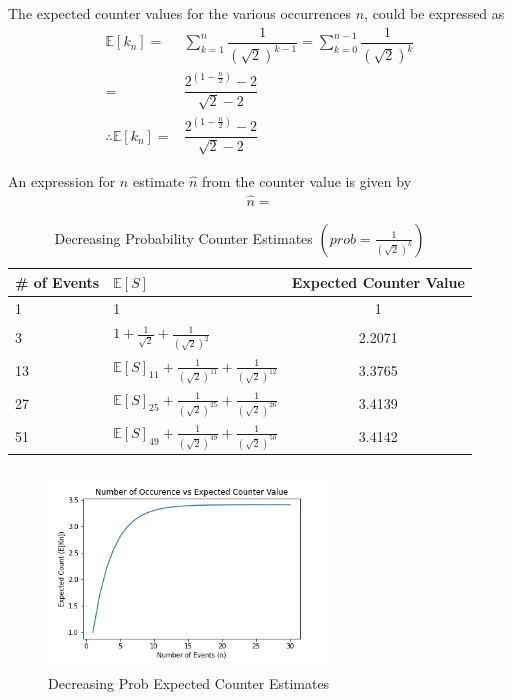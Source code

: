 \documentclass[longpaper, english, final, times]{revdetua}
\begin{document}
	
		The expected counter values for the various occurrences $n$, could be expressed as
		\begin{align*}
			\mathbb{E}[k_n]=&\sum_{k=1}^{n}\dfrac{1}{\left(\sqrt{2}\right)^{k-1}}=\sum_{k=0}^{n-1}\dfrac{1}{\left(\sqrt{2}\right)^{k}} \\
			=&\dfrac{2^{(1-\frac{n}{2})}-2}{\sqrt{2}-2} \\
			\therefore \mathbb{E}[k_n]=&\dfrac{2^{(1-\frac{n}{2})}-2}{\sqrt{2}-2} \tag{3} \label{equation:3} 
		\end{align*}
	
		An expression for $n$ estimate $\widehat{n}$ from the counter value is given by
		\begin{align*}
			\widehat{n} = 
		\end{align*}
	
		
		
		\begin{table}[b!]
			\label{table:decreasingProbCounterExpectedEstimate}
			\caption{Decreasing Probability Counter Estimates $\left(prob=\frac{1}{(\sqrt{2})^k}\right)$}
			{\def\arraystretch{2}%
				\begin{tabular}{l|l|c}
					\toprule
					\# of Events & $\mathbb{E}[S]$ & Expected Counter Value\\
					\hline
					1 & 1 & 1 \\
					3 & $1+\frac{1}{\sqrt{2}}+\frac{1}{(\sqrt{2})^2}$&2.2071\\
					13 & $\mathbb{E}[S]_{11}+\frac{1}{(\sqrt{2})^{11}}+\frac{1}{(\sqrt{2})^{12}}$&3.3765 \\
					27 & $\mathbb{E}[S]_{25}+\frac{1}{(\sqrt{2})^{25}}+\frac{1}{(\sqrt{2})^{26}}$&3.4139 \\
					51 & $\mathbb{E}[S]_{49}+\frac{1}{(\sqrt{2})^{49}}+\frac{1}{(\sqrt{2})^{50}}$&3.4142 \\
				\end{tabular}
			}
		\end{table}
			
		\begin{figure}
			\begin{center}
				\label{figure:decreasingProb}
				\caption{Decreasing Prob Expected Counter Estimates}
				\includegraphics[width=280px, height=200px]{imgs/decreasing.png}
			\end{center}		
		\end{figure}
	
\end{document}

